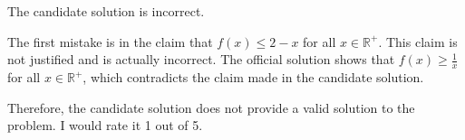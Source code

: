 The candidate solution is incorrect.

The first mistake is in the claim that $f(x) \leq 2 - x$ for all $x \in \mathbb{R}^+$. This claim is not justified and is actually incorrect. The official solution shows that $f(x) \geq \frac{1}{x}$ for all $x \in \mathbb{R}^+$, which contradicts the claim made in the candidate solution.

Therefore, the candidate solution does not provide a valid solution to the problem. I would rate it 1 out of 5.

